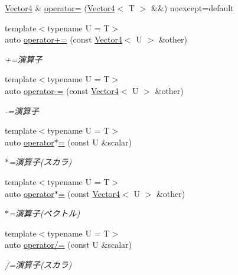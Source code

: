 \begin{DoxyCompactItemize}
\item 
\mbox{\hyperlink{classsaki_1_1_vector4}{Vector4}} \& \mbox{\hyperlink{classsaki_1_1_vector4_ae4f87b2ce6009fc590ef51736c518e4d}{operator=}} (\mbox{\hyperlink{classsaki_1_1_vector4}{Vector4}}$<$ T $>$ \&\&) noexcept=default
\item 
{\footnotesize template$<$typename U  = T$>$ }\\auto \mbox{\hyperlink{classsaki_1_1_vector4_a9488b2bfeac282b94a4bd2ae73acbe1c}{operator+=}} (const \mbox{\hyperlink{classsaki_1_1_vector4}{Vector4}}$<$ U $>$ \&other)
\begin{DoxyCompactList}\small\item\em +=演算子 \end{DoxyCompactList}\item 
{\footnotesize template$<$typename U  = T$>$ }\\auto \mbox{\hyperlink{classsaki_1_1_vector4_ac5fcc0547c4ed1a6606b804438a1ebcb}{operator-\/=}} (const \mbox{\hyperlink{classsaki_1_1_vector4}{Vector4}}$<$ U $>$ \&other)
\begin{DoxyCompactList}\small\item\em -\/=演算子 \end{DoxyCompactList}\item 
{\footnotesize template$<$typename U  = T$>$ }\\auto \mbox{\hyperlink{classsaki_1_1_vector4_a0d2783b04b8c25139339345eacedd2d6}{operator$\ast$=}} (const U \&scalar)
\begin{DoxyCompactList}\small\item\em $\ast$=演算子(スカラ) \end{DoxyCompactList}\item 
{\footnotesize template$<$typename U  = T$>$ }\\auto \mbox{\hyperlink{classsaki_1_1_vector4_a306c8e4f9d6318d7106239ca74613100}{operator$\ast$=}} (const \mbox{\hyperlink{classsaki_1_1_vector4}{Vector4}}$<$ U $>$ \&other)
\begin{DoxyCompactList}\small\item\em $\ast$=演算子(ベクトル) \end{DoxyCompactList}\item 
{\footnotesize template$<$typename U  = T$>$ }\\auto \mbox{\hyperlink{classsaki_1_1_vector4_ad02ea8316a175e5954c51504e021db34}{operator/=}} (const U \&scalar)
\begin{DoxyCompactList}\small\item\em /=演算子(スカラ) \end{DoxyCompactList}\item 

\end{DoxyCompactItemize}
